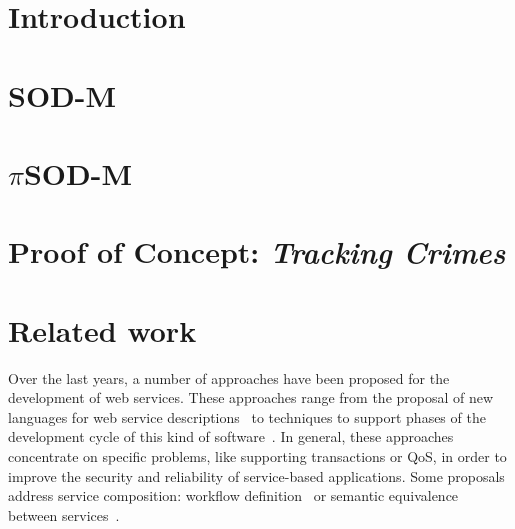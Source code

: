 \documentclass{llncs}
\theoremstyle{plain}
\theoremstyle{plain}
\theoremstyle{plain}
\begin{document}

\section{Introduction}
\label{sec:intro}



\section{SOD-M}\label{sec:sodm}



\section{$\pi$SOD-M}\label{sec:pisodm}



\section{Proof of Concept: \textit{Tracking Crimes}}\label{sec:poc}



\section{Related work}
\label{sec:related}
Over the last years, a number of approaches have been proposed for the
development of web services. 
These approaches range from the proposal of new 
languages for web service descriptions~\cite{bpel03,SBS04} 
to techniques to support phases of the development cycle of this kind of
software~\cite{lipari2007}. 
In general, these approaches concentrate on specific problems, like supporting transactions or
QoS, in order to improve the security and reliability of service-based
applications. 
Some proposals address service composition: workflow
definition~\cite{AalstHKB03,MuP06} or semantic equivalence between
services~\cite{BHM06}. 
\end{document}
